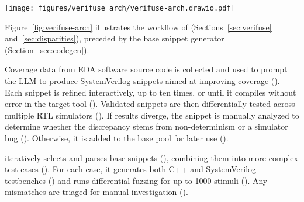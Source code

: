 \begin{figure*}[htp]

    \texttt{[image: figures/verifuse\_arch/verifuse-arch.drawio.pdf]}

    \caption{Overview of \ourname.}
    \label{fig:verifuse-arch}
\end{figure*}

Figure~\ref{fig:verifuse-arch} illustrates the workflow of \ourname (Sections~\ref{sec:verifuse} and~\ref{sec:disparities}), preceded by the base snippet generator (Section~\ref{sec:codegen}).

Coverage data from EDA software source code is collected and used to prompt the LLM to produce SystemVerilog snippets aimed at improving coverage ().
Each snippet is refined interactively, up to ten times, or until it compiles without error in the target tool ().
Validated snippets are then differentially tested across multiple RTL simulators ().
If results diverge, the snippet is manually analyzed to determine whether the discrepancy stems from non-determinism or a simulator bug ().
Otherwise, it is added to the base pool for later use ().

\para{\ourname}
\ourname iteratively selects and parses base snippets (), combining them into more complex test cases ().
For each case, it generates both C++ and SystemVerilog testbenches () and runs differential fuzzing for up to 1000 stimuli ().
Any mismatches are triaged for manual investigation ().
